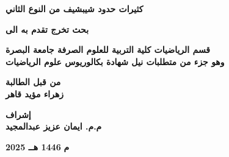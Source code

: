 \begin{titlepage}
	\vspace{1cm}
	
	\begin{center}
		\Large\textbf{كثيرات حدود شيبشيف من النوع الثاني}
	\end{center}
	\vfill
	
	\begin{center}
		\large
		\textbf{بحث تخرج تقدم به الى}
	\end{center}
	
	\begin{center}
		\large
		\textbf{قسم الرياضيات كلية التربية للعلوم الصرفة جامعة البصرة\\
			\vspace{6pt}
			وهو جزء من متطلبات نيل شهادة بكالوريوس علوم الرياضيات}
	\end{center}
	\vfill
	\begin{center}
		\large
		\textbf{من قبل الطالبة}\\
		\vspace{8pt}
		\large
		\textbf{زهراء مؤيد قاهر}
	\end{center}
	\vspace{10pt}
	\begin{center}
		\large
		\textbf{إشراف}\\
		\vspace{8pt}
		\large
		\textbf{م.م. ايمان عزيز عبدالمجيد}
	\end{center}
	\vspace{80pt}
	\begingroup
	\large{\raggedleft \textbf{2025 م}} {\hfill \textbf{1446 هــ}}
	\endgroup
\end{titlepage}
\restoregeometry